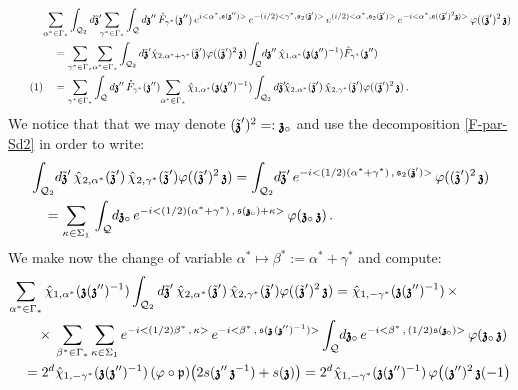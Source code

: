 \documentclass[12pt]{article}
\theoremstyle{definition}
\newcommand\numberthis{\addtocounter{equation}{1}\tag{\theequation}}
\def\T{\mathcal{Q}}
\def\p{\mathfrak{p}}
\def\s{\mathfrak{s}}
\def\bz{\mathfrak{z}\hspace*{-4pt}\mathfrak{z}}
\def\tbz{\tilde{\bz}}
\numberwithin{equation}{section}
\begin{document}
\begin{align*}
	&\underset{\alpha^*\in\Gamma_*}{\sum}\int_{\T_2}d\tilde{\bz}'\hspace*{-2pt}\underset{\gamma^*\in\Gamma_*}{\sum}\int_{\T}d\bz''\,\mathring{F}_{\gamma^*}(\bz'')\,e^{i<\alpha^*,\s(\bz'')>}\,e^{-(i/2)<\gamma^*,\s_2(\tilde{\bz}')>}\,e^{(i/2)<\alpha^*,\s_2(\tilde{\bz}')>}\,e^{-i<\alpha^*,\s((\tilde{\bz}')^2\bz)>}\,\varphi((\tilde{\bz}')^2\,\bz)\\
	&\quad=\underset{\gamma^*\in\Gamma_*}{\sum}\underset{\alpha^*\in\Gamma_*}{\sum}\int_{\T_2}d\tilde{\bz}'\hat{\chi}_{2,\alpha^*+\gamma^*}(\tilde{\bz}')\varphi((\tilde{\bz}')^2\,\bz)\int_{\T}\hspace*{-2pt}d\bz''\,\hat{\chi}_{1,\alpha^*}(\bz(\bz'')^{-1})\mathring{F}_{\gamma^*}(\bz'')\\ \numberthis \label{F-60}
	&\quad=\underset{\gamma^*\in\Gamma_*}{\sum}\int_{\T}d\bz''\,\mathring{F}_{\gamma^*}(\bz'')\underset{\alpha^*\in\Gamma_*}{\sum}\,\hat{\chi}_{1,\alpha^*}(\bz(\bz'')^{-1})\int_{\T_2}d\tilde{\bz}'\hspace*{-2pt}\hat{\chi}_{2,\alpha^*}(\tilde{\bz}')\,\hat{\chi}_{2,\gamma^*}(\tilde{\bz}')\varphi((\tilde{\bz}')^2\,\bz)\,.
\end{align*}
We notice that that we may denote $(\tbz^\prime)^2=:\bz_\circ$ and use the decomposition \eqref{F-par-Sd2} in order to write:
\begin{align}
&\int_{\T_2}\hspace*{-2pt}d\tilde{\bz}^\prime\,\hat{\chi}_{2,\alpha^*}(\tilde{\bz}^\prime)\,\hat{\chi}_{2,\gamma^*}(\tilde{\bz}^\prime)\varphi((\tilde{\bz}^\prime)^2\,\bz)=\int_{\T_2}\hspace*{-2pt}d\tilde{\bz}^\prime\,e^{-i<(1/2)(\alpha^*+\gamma^*)\,,\,\s_2(\tbz^\prime)>}\,\varphi((\tilde{\bz}^\prime)^2\,\bz)\\
&\quad=\underset{\kappa\in\Sigma_1}{\sum}\,\int_{\T}\hspace*{-2pt}d\bz_\circ\,e^{-i<(1/2)(\alpha^*+\gamma^*)\,,\,\s(\bz_\circ)+\kappa>}\,\varphi(\bz_\circ\,\bz)\,.
\end{align}
We make now the change of variable $\alpha^*\mapsto\beta^*:=\alpha^*+\gamma^*$ and compute:
\begin{align*}
&\underset{\alpha^*\in\Gamma_*}{\sum}\,\hat{\chi}_{1,\alpha^*}(\bz(\bz'')^{-1})\int_{\T_2}d\tilde{\bz}^\prime\,\hat{\chi}_{2,\alpha^*}(\tilde{\bz}')\,\hat{\chi}_{2,\gamma^*}(\tilde{\bz}')\varphi((\tilde{\bz}')^2\,\bz)=\hat{\chi}_{1,-\gamma^*}(\bz(\bz'')^{-1})\,\times\\
&\qquad\times\,\underset{\beta^*\in\Gamma_*}{\sum}\,\underset{\kappa\in\Sigma_1}{\sum}\,e^{-i<(1/2)\beta^*\,,\,\kappa>}\,e^{-i<\beta^*\,,\,\s(\bz\,(\bz^{\prime\prime})^{-1})>}\int_{\T}\hspace*{-2pt}d\bz_\circ\,e^{-i<\beta^*\,,\,(1/2)\s(\bz_\circ)>}\,\varphi(\bz_\circ\,\bz)\\
&\quad=2^d\hat{\chi}_{1,-\gamma^*}(\bz(\bz'')^{-1})\,(\varphi\circ\p)\big(2s(\bz^{\prime\prime}\,\bz^{-1})+s(\bz)\big)=2^d\hat{\chi}_{1,-\gamma^*}(\bz(\bz'')^{-1})\,\varphi\big((\bz^{\prime\prime})^2\,\bz({-1}\big)
\end{align*}
\end{document}
